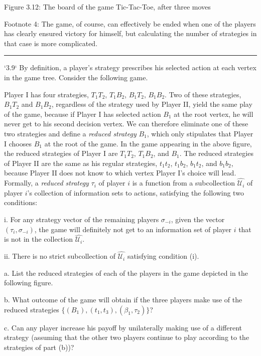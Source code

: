 \documentclass[10pt]{report}
\begin{document}
Figure 3.12: The board of the game Tic-Tac-Toe, after three moves

Footnote 4: The game, of course, can effectively be ended when one of the players has clearly ensured victory for himself, but calculating the number of strategies in that case is more complicated.

\vspace{0.5cm}
\hrule
\vspace{0.5cm}
`3.9` By definition, a player's strategy prescribes his selected action at each vertex in the game tree. Consider the following game.

Player I has four strategies, $T_{1}T_{2}$, $T_{1}B_{2}$, $B_{1}T_{2}$, $B_{1}B_{2}$. Two of these strategies, $B_{1}T_{2}$ and $B_{1}B_{2}$, regardless of the strategy used by Player II, yield the same play of the game, because if Player I has selected action $B_{1}$ at the root vertex, he will never get to his second decision vertex. We can therefore eliminate one of these two strategies and define a \textit{reduced strategy} $B_{1}$, which only stipulates that Player I chooses $B_{1}$ at the root of the game. In the game appearing in the above figure, the reduced strategies of Player I are $T_{1}T_{2}$, $T_{1}B_{2}$, and $B_{1}$. The reduced strategies of Player II are the same as his regular strategies, $t_{1}t_{2}$, $t_{1}b_{2}$, $b_{1}t_{2}$, and $b_{1}b_{2}$, because Player II does not know to which vertex Player I's choice will lead. Formally, a \textit{reduced strategy} $\tau_{i}$ of player $i$ is a function from a subcollection $\widehat{\mathcal{U}_{i}}$ of player $i$'s collection of information sets to actions, satisfying the following two conditions:

i. For any strategy vector of the remaining players $\sigma_{-i}$, given the vector $(\tau_{i},\sigma_{-i})$, the game will definitely not get to an information set of player $i$ that is not in the collection $\widehat{\mathcal{U}_{i}}$.

ii. There is no strict subcollection of $\widehat{\mathcal{U}_{i}}$ satisfying condition (i).

a. List the reduced strategies of each of the players in the game depicted in the following figure.

b. What outcome of the game will obtain if the three players make use of the reduced strategies $\{(B_{1}),(t_{1},t_{3}),(\beta_{1},\tau_{2})\}$?

c. Can any player increase his payoff by unilaterally making use of a different strategy (assuming that the other two players continue to play according to the strategies of part (b))?
\end{document}
